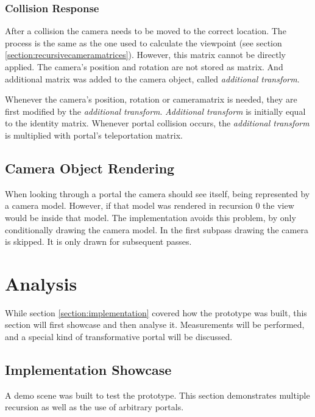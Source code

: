 \subsection{Collision Response}

After a collision the camera needs to be moved to the correct location. The process is the same as the one used to calculate the viewpoint (see section \ref{section:recursivecameramatrices}). However, this matrix cannot be directly applied. The camera's position and rotation are not stored as matrix. And additional matrix was added to the camera object, called \textit{additional transform}.

Whenever the camera's position, rotation or \gls{cameramatrix} is needed, they are first modified by the \textit{additional transform}. \textit{Additional transform} is initially equal to the identity matrix. Whenever portal collision occurs, the \textit{additional transform} is multiplied with portal's teleportation matrix.



\section{Camera Object Rendering}
When looking through a portal the camera should see itself, being represented by a camera model. However, if that model was rendered in recursion 0 the view would be inside that model. The implementation avoids this problem, by only conditionally drawing the camera model. In the first subpass drawing the camera is skipped. It is only drawn for subsequent passes.




\chapter{Analysis}
While section \ref{section:implementation} covered how the prototype was built, this section will first showcase and then analyse it. Measurements will be performed, and a special kind of transformative portal will be discussed.

\section{Implementation Showcase}

A demo scene was built to test the prototype. This section demonstrates multiple recursion as well as the use of arbitrary portals.

